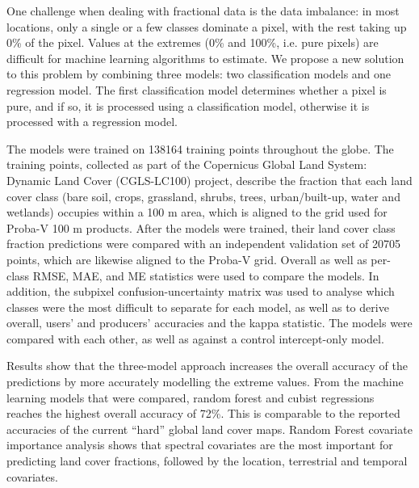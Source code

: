\documentclass[a4paper,10pt]{article}
\begin{document}
{One challenge when dealing with fractional data is the data imbalance: in most locations, only a single or a few classes dominate a pixel, with the rest taking up 0\% of the pixel. Values at the extremes (0\% and 100\%, i.e. pure pixels) are difficult for machine learning algorithms to estimate. We propose a new solution to this problem by combining three models: two classification models and one regression model. The first classification model determines whether a pixel is pure, and if so, it is processed using a classification model, otherwise it is processed with a regression model.


The models were trained on 138164 training points throughout the globe. The training points, collected as part of the Copernicus Global Land System: Dynamic Land Cover (CGLS-LC100) project, describe the fraction that each land cover class (bare soil, crops, grassland, shrubs, trees, urban/built-up, water and wetlands) occupies within a 100 m area, which is aligned to the grid used for Proba-V 100 m products. After the models were trained, their land cover class fraction predictions were compared with an independent validation set of 20705 points, which are likewise aligned to the Proba-V grid. Overall as well as per-class RMSE, MAE, and ME statistics were used to compare the models. In addition, the subpixel confusion-uncertainty matrix was used to analyse which classes were the most difficult to separate for each model, as well as to derive overall, users' and producers' accuracies and the kappa statistic. The models were compared with each other, as well as against a control intercept-only model.

Results show that the three-model approach increases the overall accuracy of the predictions by more accurately modelling the extreme values. From the machine learning models that were compared, random forest and cubist regressions reaches the highest overall accuracy of 72\%. This is comparable to the reported accuracies of the current ``hard'' global land cover maps. Random Forest covariate importance analysis shows that spectral covariates are the most important for predicting land cover fractions, followed by the location, terrestrial and temporal covariates.

}
\end{document}

